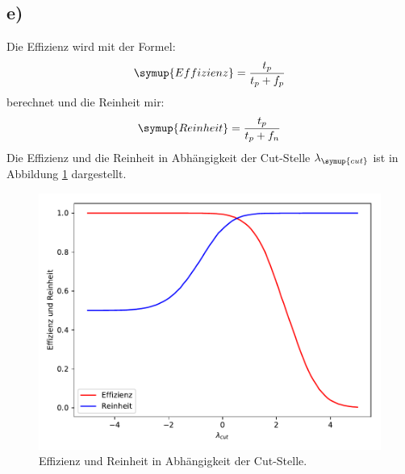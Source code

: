 \subsection{e)}
Die Effizienz wird mit der Formel:
\begin{equation*}
  \symup{Effizienz} = \frac{t_p}{t_p + f_p}
\end{equation*}
berechnet und die Reinheit mir:
\begin{equation}
  \symup{Reinheit} = \frac{t_p}{t_p + f_n}
\end{equation}
Die Effizienz und die Reinheit in Abhängigkeit der Cut-Stelle $\lambda_{\symup{cut}}$ ist in Abbildung
\ref{abb:2} dargestellt.
\begin{figure}
  \centering
  \includegraphics[scale=0.7]{Aufgabe12/EffizienzReinheit.pdf}
  \caption{Effizienz und Reinheit in Abhängigkeit der Cut-Stelle.}
  \label{abb:2}
\end{figure}


